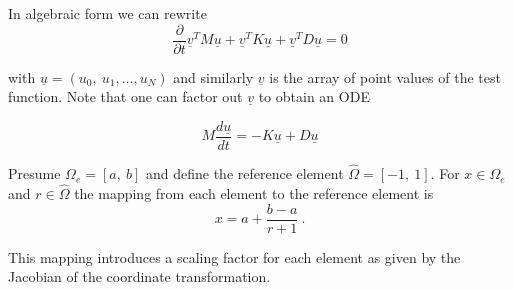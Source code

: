 \documentclass[10pt]{article}
\begin{document}
In algebraic form we can rewrite
\begin{equation}
\frac{\partial}{\partial t}\underline{v}^TM\underline{u} + \underline{v}^TK\underline{u}+\underline{v}^TD\underline{u}=0
\end{equation}

with $\underline{u}=(u_0,\ u_1, \ldots, u_N)$ and similarly $\underline v$ is the array of point values of the test function. 
Note that one can factor out $\underline v$ to obtain an ODE

\begin{equation}
M\frac{d \underline{u}}{d t} =- K \underline{u}+ D \underline{u} \label{eq:discrete}
\end{equation}

Presume  $\Omega_e = [a, \ b]$ and define the reference element $\hat{\Omega} = [-1, \ 1]$.
For $x\in \Omega_e$ and $r \in \hat{\Omega}$ the mapping from each element to the reference element is
$$x= a+ \frac{b-a}{r+1}\ .$$

This mapping introduces a scaling factor for each element as given by the Jacobian of the coordinate transformation.

\end{document}
